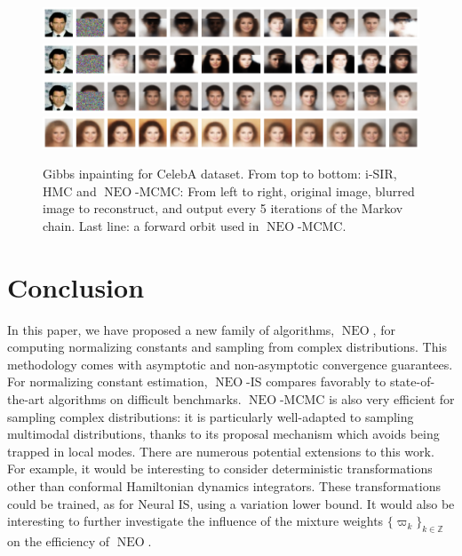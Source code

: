 \documentclass{article}
\def\IFIS{\ensuremath{\operatorname{NEO}}}
\def\NEO{{\small \IFIS}}
\newcommand{\1}{\mathds{1}}
\def\zset{\mathbb{Z}}
\begin{document}
 \begin{figure}
     \centering
     \includegraphics[width = .91\linewidth]{celeba_inpainting_isir_w_cond.pdf}
\includegraphics[width = .91\linewidth]{celeba_inpainting_hmc_w_cond.pdf}
\includegraphics[width = .91\linewidth]{celeba_inpainting_neo_w_cond.pdf}
\includegraphics[width = .91\linewidth]{celeba_inpainting_neo_orbit.pdf}
     \caption{Gibbs inpainting for CelebA dataset. 
    From top to bottom: i-SIR, HMC and \NEO-MCMC: From left to right, original image, blurred image to reconstruct, and output every 5 iterations of the Markov chain. Last line: a forward orbit used in \NEO-MCMC.}
     \label{fig:gibbs_inpainting}
 \end{figure}
 
\section{Conclusion}
\label{sec:conclusion}
In this paper, we have proposed a new family of algorithms, \NEO, for computing normalizing constants and sampling from complex distributions. This methodology comes with asymptotic and non-asymptotic convergence guarantees. For normalizing constant estimation, \NEO-IS compares favorably to state-of-the-art algorithms on difficult benchmarks.  \NEO-MCMC is also very efficient for sampling  complex distributions: it is particularly well-adapted to sampling multimodal distributions, thanks to its proposal mechanism which avoids being trapped in local modes. There are numerous potential extensions to this work. For example, it would be interesting to consider deterministic transformations other than conformal Hamiltonian dynamics integrators. These transformations could be trained, as for Neural IS, using a variation lower bound. It would also be interesting to further investigate the influence of the mixture weights $\{\varpi_k\}_{k\in\zset}$ on the efficiency of \NEO. 
\end{document}

